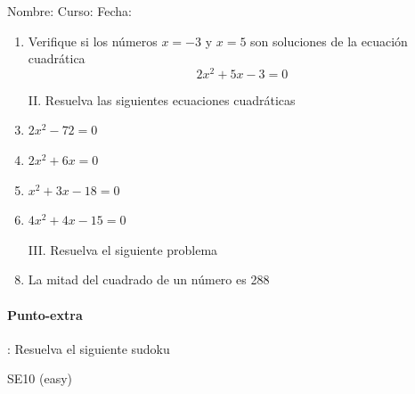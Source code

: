 \documentclass[fleqn]{article}
\newcommand{\LineaNombre}{%
\par
\vspace{\baselineskip}
Nombre:\hrulefill \; Curso: \underline{\hspace*{48pt}} \; Fecha: \underline{\hspace*{2.5cm}} \relax
\par}
\begin{document}
\LineaNombre
\begin{enumerate}
 \item Verifique si los números $x=-3$ \; y \; $x=5$ son soluciones de la ecuación cuadrática \[2x^{2}+5x-3=0\] \noanswer

\item[II.] Resuelva las siguientes ecuaciones cuadráticas
 \item $2x^{2}-72=0$\noanswer
 \item $2x^{2}+6x=0$\noanswer
 \newpage
 \item $x^{2}+3x-18=0$\noanswer
 \item $4x^{2}+4x-15=0$\noanswer
 \item[III.] Resuelva el siguiente problema
 \item La mitad del cuadrado de un número es 288\noanswer
 \end{enumerate}
 \begin{minipage}{.4\textwidth}
\paragraph*{Punto-extra}: Resuelva el siguiente sudoku 
 \end{minipage}
 \cluefont{\Large}
\begin{minipage}{.55\textwidth}
 \begin{minipage}{0.95\linewidth}\begin{center}
SE10 (easy) \\
\end{center}\end{minipage}
\end{minipage}
\end{document}
